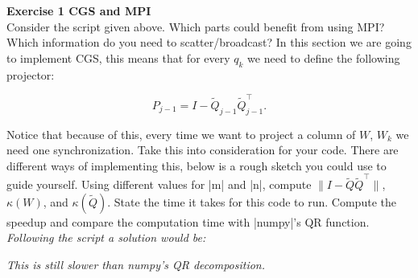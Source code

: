 \documentclass[11pt]{article}
\begin{document}
\bigskip

{\bf{Exercise 1 CGS and MPI}}\\

Consider the script given above. Which parts could benefit from using MPI? Which information do you need to scatter/broadcast? In this section we are going to implement CGS, this means that for every $q_k$ we need to define the following projector:

\[ P_{j-1} = I - \tilde{Q}_{j-1} \tilde{Q}^\top_{j-1}. \]

Notice that because of this, every time we want to project a column of $W$, $W_k$ we need one synchronization. Take this into consideration for your code. There are different ways of implementing this, below is a rough sketch you could use to guide yourself. Using different values for |m| and |n|, compute $\|I - \tilde{Q}\tilde{Q}^\top\|$, $\kappa(W)$, and $\kappa(\tilde{Q})$. State the time it takes for this code to run. Compute the speedup and compare the computation time with |numpy|'s QR function. \\

\textit{Following the script a solution would be:}



\textit{This is still slower than numpy's QR decomposition. }
\end{document}
